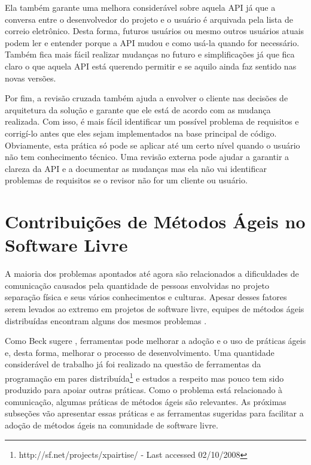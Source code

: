 Ela também garante uma melhora considerável sobre aquela API já que a
conversa entre o desenvolvedor do projeto e o usuário é arquivada pela
lista de correio eletrônico. Desta forma, futuros usuários ou mesmo
outros usuários atuais podem ler e entender porque a API mudou e como
usá-la quando for necessário. Também fica mais fácil realizar mudanças
no futuro e simplificações já que fica claro o que aquela API está
querendo permitir e se aquilo ainda faz sentido nas novas versões.

Por fim, a revisão cruzada também ajuda a envolver o cliente nas
decisões de arquitetura da solução e garante que ele está de acordo
com as mudança realizada. Com isso, é mais fácil identificar um
possível problema de requisitos e corrigí-lo antes que eles sejam
implementados na base principal de código. Obviamente, esta prática só
pode se aplicar até um certo nível quando o usuário não tem
conhecimento técnico. Uma revisão externa pode ajudar a garantir a
clareza da API e a documentar as mudanças mas ela não vai identificar
problemas de requisitos se o revisor não for um cliente ou usuário.

\section{Contribuições de Métodos Ágeis no Software Livre}
\label{sec:agile-improve-os}

A maioria dos problemas apontados até agora são relacionados a
dificuldades de comunicação causados pela quantidade de pessoas
envolvidas no projeto separação física e seus vários conhecimentos e
culturas. Apesar desses fatores serem levados ao extremo em projetos
de software livre, equipes de métodos ágeis distribuídas encontram
alguns dos mesmos problemas \cite{Sutherland2007,Maurer2002}.

Como Beck sugere \cite{Beck2008}, ferramentas pode melhorar a adoção e
o uso de práticas ágeis e, desta forma, melhorar o processo de
desenvolvimento. Uma quantidade considerável de trabalho já foi
realizado na questão de ferramentas da programação em pares
distribuída\footnote{http://sf.net/projects/xpairtise/ - Last accessed
  02/10/2008} e estudos a respeito \cite{Nagappan2003} mas pouco tem
sido produzido para apoiar outras práticas. Como o problema está
relacionado à comunicação, algumas práticas de métodos ágeis são
relevantes. As próximas subseções vão apresentar essas práticas e as
ferramentas sugeridas para facilitar a adoção de métodos ágeis na
comunidade de software livre.

